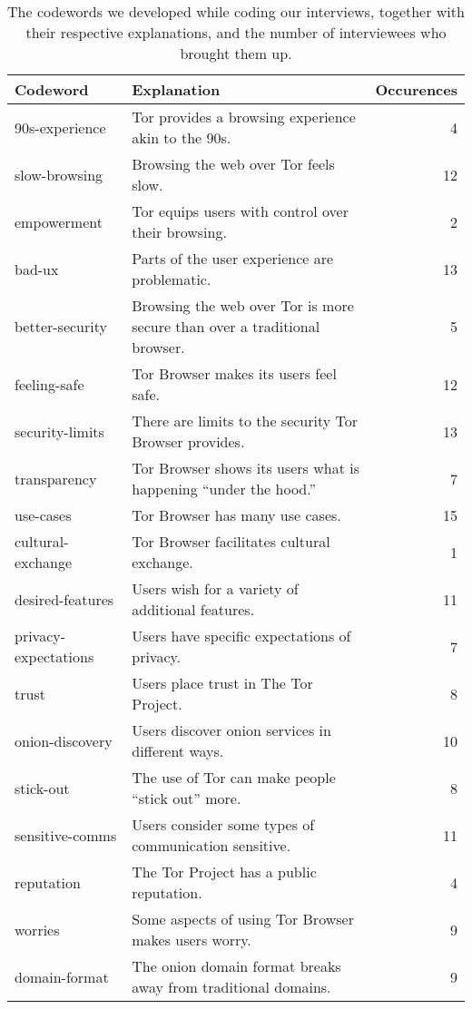 \begin{table*}[ht]
	\centering
	\caption{The codewords we developed while coding our interviews, together
	with their respective explanations, and the number of interviewees who
	brought them up.}

	\label{tab:tor-sketches}

	\begin{tabular}{l l r}
	\toprule
	Codeword & Explanation & Occurences \\
	\midrule

	90s-experience & Tor provides a browsing experience akin to the 90s. & 4 \\
	slow-browsing & Browsing the web over Tor feels slow. & 12 \\
	empowerment & Tor equips users with control over their browsing. & 2 \\
	bad-ux & Parts of the user experience are problematic. & 13 \\
	better-security & Browsing the web over Tor is more secure than over a traditional browser. & 5 \\
	feeling-safe & Tor Browser makes its users feel safe. & 12 \\
	security-limits & There are limits to the security Tor Browser provides. & 13 \\
	transparency & Tor Browser shows its users what is happening ``under the hood.'' & 7 \\
	use-cases & Tor Browser has many use cases. & 15 \\
	cultural-exchange & Tor Browser facilitates cultural exchange. & 1 \\
	desired-features & Users wish for a variety of additional features. & 11 \\
	privacy-expectations & Users have specific expectations of privacy. & 7 \\
	trust & Users place trust in The Tor Project. & 8 \\
	onion-discovery & Users discover onion services in different ways. & 10 \\
	stick-out & The use of Tor can make people ``stick out'' more. & 8 \\
	sensitive-comms & Users consider some types of communication sensitive. & 11 \\
	reputation & The Tor Project has a public reputation. & 4 \\
	worries & Some aspects of using Tor Browser makes users worry. & 9 \\
	domain-format & The onion domain format breaks away from traditional domains. & 9 \\

\end{tabular}
\end{table*}
